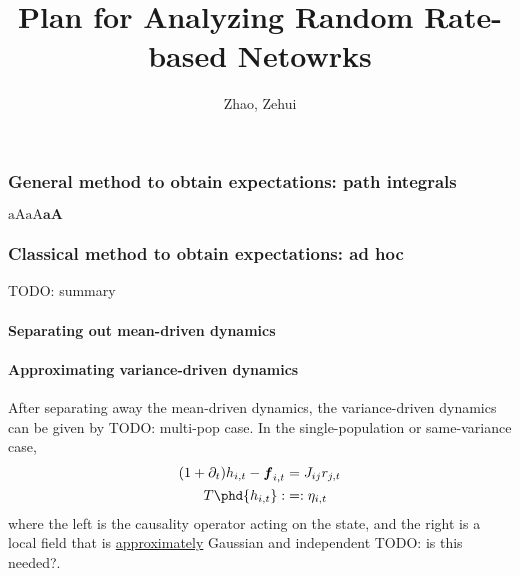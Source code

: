 \documentclass[11pt,openany,oneside]{article} %
\title{\vspace{-2em}Plan for Analyzing Random Rate-based Netowrks}
\author{Zhao, Zehui}
\date{}
\newcommand{\todo}[1]{{\color{red} TODO: #1}}
\begin{document}
\maketitle

\subsubsection{General method to obtain expectations: path integrals}
$\mathrm{aA}\boldsymbol{\mathrm{aA}}\mathbf{aA}$

\subsubsection{Classical method to obtain expectations: ad hoc}
\todo{summary}

\paragraph{Separating out mean-driven dynamics}

\paragraph{Approximating variance-driven dynamics}
After separating away the mean-driven dynamics, the variance-driven dynamics can be given by
\todo{multi-pop case}.  In the single-population or same-variance case, 
\begin{equation}
  \label{eq:var-dyn}
  \begin{aligned}
      (1+\del_t)h_{i,t} - \bd{f}_{i,t} &= J_{ij}r_{j,t}\\
      T\phd{h_{i,t}} :&= : \eta_{i,t}
  \end{aligned}
\end{equation}
where the left is the causality operator acting on the state, and the right is a local field that is
\uline{approximately} Gaussian and independent \todo{is this needed?}.
\end{document}
